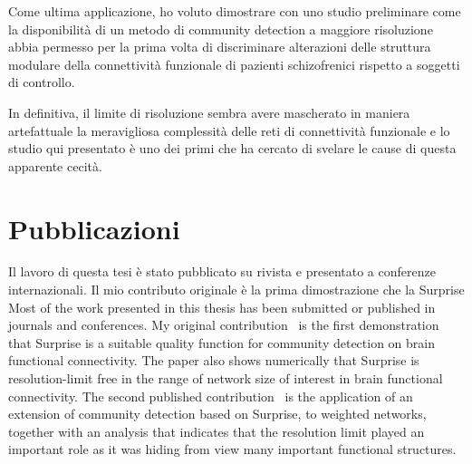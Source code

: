 Come ultima applicazione, ho voluto dimostrare con uno studio preliminare come la disponibilità di un metodo di community detection a maggiore risoluzione abbia permesso per la prima volta di discriminare alterazioni delle struttura modulare della connettività funzionale di pazienti schizofrenici rispetto a soggetti di controllo.

In definitiva, il limite di risoluzione sembra avere mascherato in maniera artefattuale la meravigliosa complessità delle reti di connettività funzionale e lo studio qui presentato è uno dei primi che ha cercato di svelare le cause di questa apparente cecità.

\section*{Pubblicazioni}
Il lavoro di questa tesi è stato pubblicato su rivista e presentato a conferenze internazionali. Il mio contributo originale è la prima dimostrazione che la Surprise 
Most of the work presented in this thesis has been submitted or published in journals and conferences. My original contribution~\cite{nicolini2016} is the first demonstration that Surprise is a suitable quality function for community detection on brain functional connectivity.
The paper also shows numerically that Surprise is resolution-limit free in the range of network size of interest in brain functional connectivity.
The second published contribution~\cite{nicolini2017} is the application of an extension of community detection based on Surprise, to weighted networks, together with an analysis that indicates that the resolution limit played an important role as it was hiding from view many important functional structures.